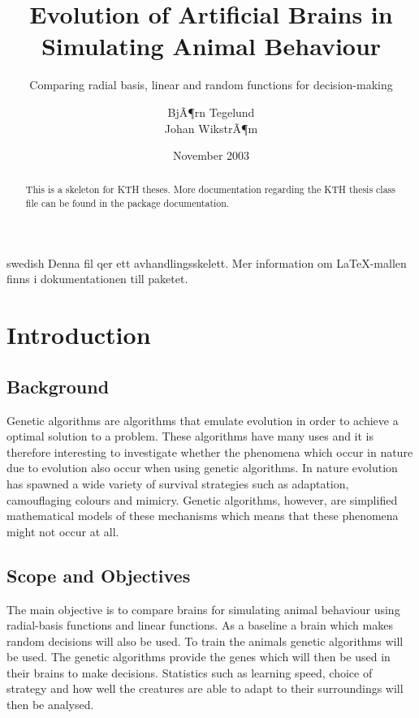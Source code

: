 \documentclass[a4paper,11pt]{kth-mag}
\title{Evolution of Artificial Brains in Simulating Animal Behaviour}
\subtitle{Comparing radial basis, linear and random functions for decision-making}
\author{BjÃ¶rn Tegelund\\Johan WikstrÃ¶m}
\date{November 2003}
\begin{document}
\frontmatter
\pagestyle{empty}
\removepagenumbers
\maketitle
{}
\begin{abstract}
  This is a skeleton for KTH theses. More documentation
  regarding the KTH thesis class file can be found in
  the package documentation.

\end{abstract}
\clearpage
\begin{foreignabstract}{swedish}
  Denna fil qer ett avhandlingsskelett.
  Mer information om \LaTeX-mallen finns i
  dokumentationen till paketet.

\end{foreignabstract}
\clearpage
\tableofcontents*
\mainmatter
\pagestyle{newchap}
\chapter{Introduction}

\section{Background}

Genetic algorithms are algorithms that emulate evolution in order to achieve a optimal solution to a problem. 
These algorithms have many uses and it is therefore interesting to investigate whether the phenomena which occur in nature due to evolution also occur when using genetic algorithms. In nature evolution has spawned a wide variety
of survival strategies such as adaptation, camouflaging colours and mimicry. Genetic algorithms, however, are 
 simplified mathematical models of these mechanisms which means that these phenomena might not occur 
at all.

\section{Scope and Objectives}

The main objective is to compare brains for simulating animal behaviour using radial-basis functions and linear functions. As a baseline a brain which makes random decisions will also be used. To train the animals genetic algorithms will be used. The genetic algorithms provide the genes which will then be used in their brains to make decisions. Statistics such as learning speed, choice of strategy and how well the creatures are able to adapt to their surroundings will then be analysed. 
\end{document}
